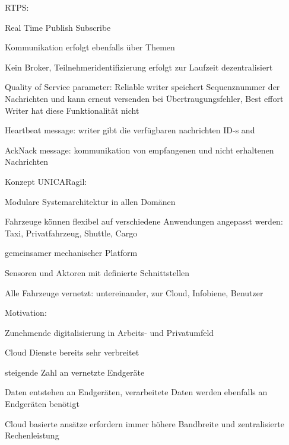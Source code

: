 \begin{notes}
\begin{notes}
\begin{notes}
                \item RTPS:
                \begin{notes}
                    \item Real Time Publish Subscribe
                    \item Kommunikation erfolgt ebenfalls über Themen
                    \item Kein Broker, Teilnehmeridentifizierung erfolgt zur Laufzeit dezentralisiert
                    \item Quality of Service parameter: Reliable writer speichert Sequenznummer der Nachrichten und kann erneut versenden bei Übertraugungsfehler, Best effort Writer hat diese Funktionalität nicht
                    \item Heartbeat message: writer gibt die verfügbaren nachrichten ID-s and
                    \item AckNack message: kommunikation von empfangenen und nicht erhaltenen Nachrichten
                \end{notes}
            \end{notes}
    \end{notes}
    \item Konzept UNICARagil:
        \begin{notes}
            \item Modulare Systemarchitektur in allen Domänen 
            \item Fahrzeuge können flexibel auf verschiedene Anwendungen angepasst werden: Taxi, Privatfahrzeug, Shuttle, Cargo
            \item gemeinsamer mechanischer Platform
            \item Sensoren und Aktoren mit definierte Schnittstellen
            \item Alle Fahrzeuge vernetzt: untereinander, zur Cloud, Infobiene, Benutzer 
        \end{notes}
    \item Motivation:
    \begin{notes}
        \item Zunehmende digitalisierung in Arbeits- und Privatumfeld
        \item Cloud Dienste bereits sehr verbreitet
        \item steigende Zahl an vernetzte Endgeräte
        \item Daten entstehen an Endgeräten, verarbeitete Daten werden ebenfalls an Endgeräten benötigt
        \item Cloud basierte ansätze erfordern immer höhere Bandbreite und zentralisierte Rechenleistung

\end{notes}
\end{notes}
